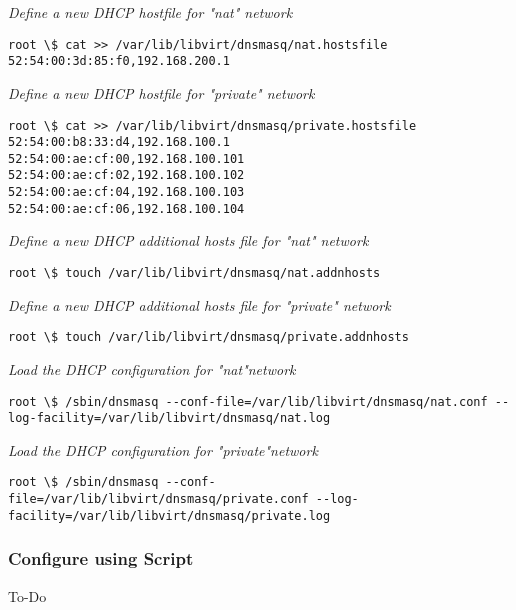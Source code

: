\documentclass[12pt]{extarticle}
\begin{document}
\noindent
\textit{Define a new DHCP hostfile for "nat" network}
\begin{verbatim}
root \$ cat >> /var/lib/libvirt/dnsmasq/nat.hostsfile
52:54:00:3d:85:f0,192.168.200.1
\end{verbatim}

\noindent
\textit{Define a new DHCP hostfile for "private" network}
\begin{verbatim}
root \$ cat >> /var/lib/libvirt/dnsmasq/private.hostsfile
52:54:00:b8:33:d4,192.168.100.1
52:54:00:ae:cf:00,192.168.100.101
52:54:00:ae:cf:02,192.168.100.102
52:54:00:ae:cf:04,192.168.100.103
52:54:00:ae:cf:06,192.168.100.104
\end{verbatim}

\noindent
\textit{Define a new DHCP additional hosts file for "nat" network}
\begin{verbatim}
root \$ touch /var/lib/libvirt/dnsmasq/nat.addnhosts
\end{verbatim}

\noindent
\textit{Define a new DHCP additional hosts file for "private" network}
\begin{verbatim}
root \$ touch /var/lib/libvirt/dnsmasq/private.addnhosts
\end{verbatim}


\noindent
\textit{Load the DHCP configuration for "nat"network}
\begin{verbatim}
root \$ /sbin/dnsmasq --conf-file=/var/lib/libvirt/dnsmasq/nat.conf --log-facility=/var/lib/libvirt/dnsmasq/nat.log
\end{verbatim}

\noindent
\textit{Load the DHCP configuration for "private"network}
\begin{verbatim}
root \$ /sbin/dnsmasq --conf-file=/var/lib/libvirt/dnsmasq/private.conf --log-facility=/var/lib/libvirt/dnsmasq/private.log
\end{verbatim}

\subsubsection{Configure using Script}
To-Do
\end{document}
